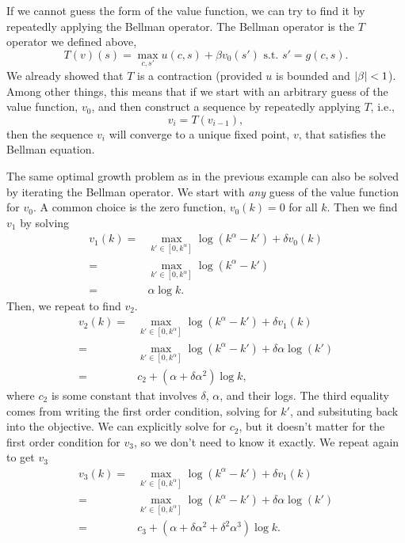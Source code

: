 If we cannot guess the form of the value function, we can try to find
it by repeatedly applying the Bellman operator. The Bellman operator
is the $T$ operator we defined above,
\[ T(v)(s) = \max_{c,s'} u(c,s) + \beta v_0(s') \text{ s.t. } s'=g(c,s). \]
We already showed that $T$ is a contraction (provided $u$ is bounded
and $\left\vert {\beta} \right\vert < 1$). Among other things, this means that if we
start with an arbitrary guess of the value function, $v_0$, and then
construct a sequence by repeatedly applying $T$, i.e., 
\[ v_i = T(v_{i-1}), \]
then the sequence $v_i$ will converge to a unique fixed point, $v$,
that satisfies the Bellman equation. 
\begin{example}
  The same optimal growth problem as in the previous example can also
  be solved by iterating the Bellman operator. We start with
  \emph{any} guess of the value function for $v_0$. A common choice is
  the zero function, $v_0(k) = 0$ for all $k$. Then we find $v_1$ by
  solving 
  \begin{align*}
    v_1(k) = & \max_{k' \in [0,k^\alpha]} \log(k^\alpha - k') + \delta v_0(k)
    \\
    = & \max_{k' \in [0,k^\alpha]} \log(k^\alpha - k') \\
    = & \alpha \log k.
  \end{align*}
  Then, we repeat to find $v_2$.
  \begin{align*}
    v_2(k) = & \max_{k' \in [0,k^\alpha]} \log(k^\alpha - k') + \delta v_1(k)
    \\
    = & \max_{k' \in [0,k^\alpha]} \log(k^\alpha - k') + \delta
    \alpha \log(k')  \\
    = & c_2 + (\alpha + \delta \alpha^2) \log k,
  \end{align*}
  where $c_2$ is some constant that involves $\delta$, $\alpha$, and
  their logs. The third equality comes from writing the first order
  condition, solving for $k'$, and subsituting back into the
  objective.  We can explicitly solve for $c_2$, but it doesn't matter
  for the first order condition for $v_3$, so we don't need to know it
  exactly. We repeat again to get $v_3$
  \begin{align*}
    v_3(k) = & \max_{k' \in [0,k^\alpha]} \log(k^\alpha - k') + \delta v_1(k)
    \\
    = & \max_{k' \in [0,k^\alpha]} \log(k^\alpha - k') + \delta
    \alpha \log(k')  \\
    = & c_3 + (\alpha + \delta \alpha^2 + \delta^2 \alpha^3) \log k.
  \end{align*}    

\end{example}

